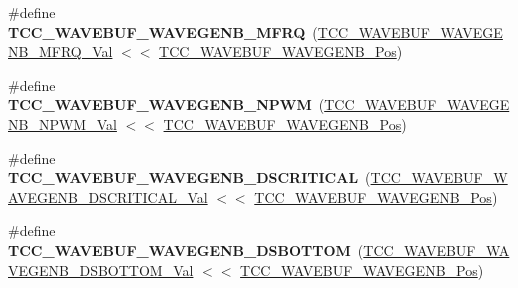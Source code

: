 \begin{DoxyCompactItemize}
\item 
\hypertarget{group___s_a_m_l21___t_c_c_ga4f49f7b4d7e9c59dc69defe531a1fd6e}{}\#define {\bfseries T\+C\+C\+\_\+\+W\+A\+V\+E\+B\+U\+F\+\_\+\+W\+A\+V\+E\+G\+E\+N\+B\+\_\+\+M\+F\+R\+Q}~(\hyperlink{group___s_a_m_l21___t_c_c_ga9cb6a04b3777b40fee042239565be89b}{T\+C\+C\+\_\+\+W\+A\+V\+E\+B\+U\+F\+\_\+\+W\+A\+V\+E\+G\+E\+N\+B\+\_\+\+M\+F\+R\+Q\+\_\+\+Val} $<$$<$ \hyperlink{group___s_a_m_l21___t_c_c_ga873098e9f57606f2bb54409caa7482f9}{T\+C\+C\+\_\+\+W\+A\+V\+E\+B\+U\+F\+\_\+\+W\+A\+V\+E\+G\+E\+N\+B\+\_\+\+Pos})\label{group___s_a_m_l21___t_c_c_ga4f49f7b4d7e9c59dc69defe531a1fd6e}

\item 
\hypertarget{group___s_a_m_l21___t_c_c_gacd42eda386609625d747c15bc305ce53}{}\#define {\bfseries T\+C\+C\+\_\+\+W\+A\+V\+E\+B\+U\+F\+\_\+\+W\+A\+V\+E\+G\+E\+N\+B\+\_\+\+N\+P\+W\+M}~(\hyperlink{group___s_a_m_l21___t_c_c_ga60825478ecd30e09b62be778006fcb85}{T\+C\+C\+\_\+\+W\+A\+V\+E\+B\+U\+F\+\_\+\+W\+A\+V\+E\+G\+E\+N\+B\+\_\+\+N\+P\+W\+M\+\_\+\+Val} $<$$<$ \hyperlink{group___s_a_m_l21___t_c_c_ga873098e9f57606f2bb54409caa7482f9}{T\+C\+C\+\_\+\+W\+A\+V\+E\+B\+U\+F\+\_\+\+W\+A\+V\+E\+G\+E\+N\+B\+\_\+\+Pos})\label{group___s_a_m_l21___t_c_c_gacd42eda386609625d747c15bc305ce53}

\item 
\hypertarget{group___s_a_m_l21___t_c_c_ga9e420854e0fb78192e48ab4761951367}{}\#define {\bfseries T\+C\+C\+\_\+\+W\+A\+V\+E\+B\+U\+F\+\_\+\+W\+A\+V\+E\+G\+E\+N\+B\+\_\+\+D\+S\+C\+R\+I\+T\+I\+C\+A\+L}~(\hyperlink{group___s_a_m_l21___t_c_c_gaac09ec49f12c883922a3d9e26e19d210}{T\+C\+C\+\_\+\+W\+A\+V\+E\+B\+U\+F\+\_\+\+W\+A\+V\+E\+G\+E\+N\+B\+\_\+\+D\+S\+C\+R\+I\+T\+I\+C\+A\+L\+\_\+\+Val} $<$$<$ \hyperlink{group___s_a_m_l21___t_c_c_ga873098e9f57606f2bb54409caa7482f9}{T\+C\+C\+\_\+\+W\+A\+V\+E\+B\+U\+F\+\_\+\+W\+A\+V\+E\+G\+E\+N\+B\+\_\+\+Pos})\label{group___s_a_m_l21___t_c_c_ga9e420854e0fb78192e48ab4761951367}

\item 
\hypertarget{group___s_a_m_l21___t_c_c_gac7e0e612cf910a4c9832a27e1dc85357}{}\#define {\bfseries T\+C\+C\+\_\+\+W\+A\+V\+E\+B\+U\+F\+\_\+\+W\+A\+V\+E\+G\+E\+N\+B\+\_\+\+D\+S\+B\+O\+T\+T\+O\+M}~(\hyperlink{group___s_a_m_l21___t_c_c_gafe74ad77b42552eb107f09a1e1ef6352}{T\+C\+C\+\_\+\+W\+A\+V\+E\+B\+U\+F\+\_\+\+W\+A\+V\+E\+G\+E\+N\+B\+\_\+\+D\+S\+B\+O\+T\+T\+O\+M\+\_\+\+Val} $<$$<$ \hyperlink{group___s_a_m_l21___t_c_c_ga873098e9f57606f2bb54409caa7482f9}{T\+C\+C\+\_\+\+W\+A\+V\+E\+B\+U\+F\+\_\+\+W\+A\+V\+E\+G\+E\+N\+B\+\_\+\+Pos})\label{group___s_a_m_l21___t_c_c_gac7e0e612cf910a4c9832a27e1dc85357}


\end{DoxyCompactItemize}
